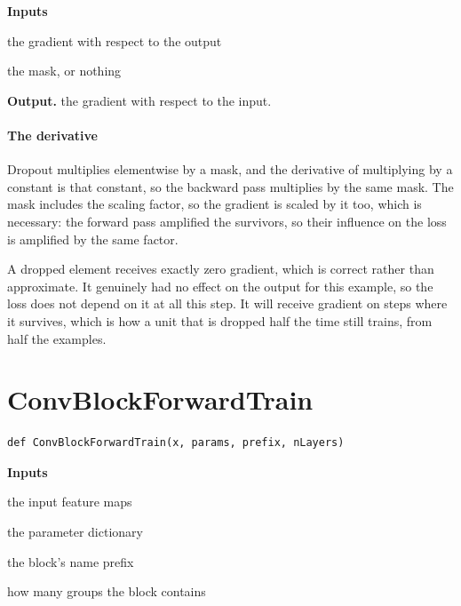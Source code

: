 \noindent\textbf{Inputs}
\begin{description}[leftmargin=2.2em,style=nextline,font=\normalfont\ttfamily]\setlength\itemsep{1pt}
  \item[{dout}] \normalfont the gradient with respect to the output
  \item[{cache}] \normalfont the mask, or nothing
\end{description}

\noindent\textbf{Output.} the gradient with respect to the input.


\paragraph{The derivative}
Dropout multiplies elementwise by a mask, and the derivative of multiplying by a constant is that constant, so the backward pass multiplies by the same mask. The mask includes the scaling factor, so the gradient is scaled by it too, which is necessary: the forward pass amplified the survivors, so their influence on the loss is amplified by the same factor.

A dropped element receives exactly zero gradient, which is correct rather than approximate. It genuinely had no effect on the output for this example, so the loss does not depend on it at all this step. It will receive gradient on steps where it survives, which is how a unit that is dropped half the time still trains, from half the examples.


\section{ConvBlockForwardTrain}
\begin{lstlisting}[style=sig]
def ConvBlockForwardTrain(x, params, prefix, nLayers)
\end{lstlisting}

\noindent\textbf{Inputs}
\begin{description}[leftmargin=2.2em,style=nextline,font=\normalfont\ttfamily]\setlength\itemsep{1pt}
  \item[{x}] \normalfont the input feature maps
  \item[{params}] \normalfont the parameter dictionary
  \item[{prefix}] \normalfont the block's name prefix
  \item[{nLayers}] \normalfont how many groups the block contains
\end{description}

